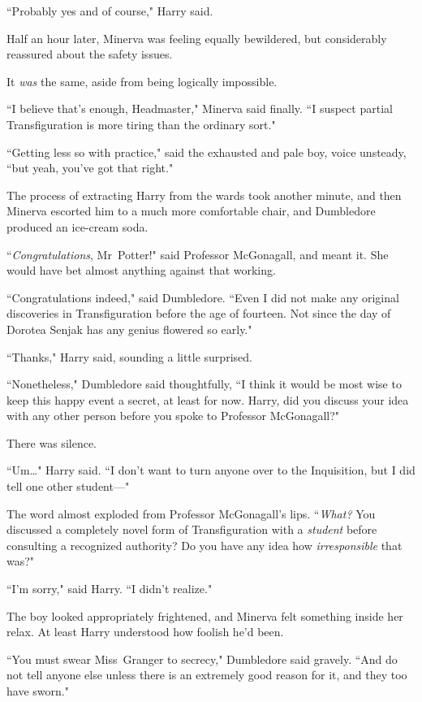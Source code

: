 ``Probably yes and of course," Harry said.

Half an hour later, Minerva was feeling equally bewildered, but considerably reassured about the safety issues.

It \emph{was} the same, aside from being logically impossible.

``I believe that's enough, Headmaster," Minerva said finally. ``I suspect partial Transfiguration is more tiring than the ordinary sort."

``Getting less so with practice," said the exhausted and pale boy, voice unsteady, ``but yeah, you've got that right."

The process of extracting Harry from the wards took another minute, and then Minerva escorted him to a much more comfortable chair, and Dumbledore produced an ice-cream soda.

``\emph{Congratulations}, Mr~Potter!" said Professor McGonagall, and meant it. She would have bet almost anything against that working.

``Congratulations indeed," said Dumbledore. ``Even I did not make any original discoveries in Transfiguration before the age of fourteen. Not since the day of Dorotea Senjak has any genius flowered so early."

``Thanks," Harry said, sounding a little surprised.

``Nonetheless," Dumbledore said thoughtfully, ``I think it would be most wise to keep this happy event a secret, at least for now. Harry, did you discuss your idea with any other person before you spoke to Professor McGonagall?"

There was silence.

``Um{\ldots}" Harry said. ``I don't want to turn anyone over to the Inquisition, but I did tell one other student—"

The word almost exploded from Professor McGonagall's lips. ``\emph{What?} You discussed a completely novel form of Transfiguration with a \emph{student} before consulting a recognized authority? Do you have any idea how \emph{irresponsible} that was?"

``I'm sorry," said Harry. ``I didn't realize."

The boy looked appropriately frightened, and Minerva felt something inside her relax. At least Harry understood how foolish he'd been.

``You must swear Miss~Granger to secrecy," Dumbledore said gravely. ``And do not tell anyone else unless there is an extremely good reason for it, and they too have sworn."

